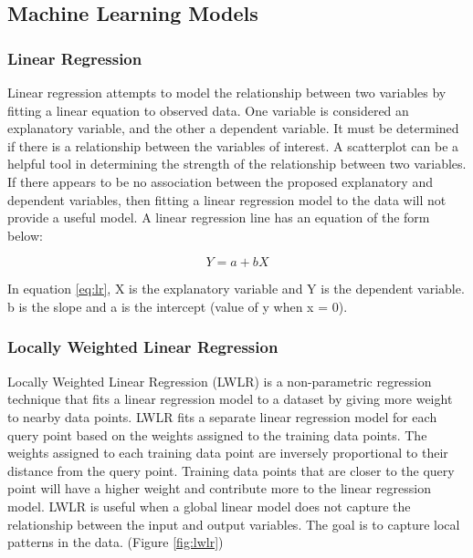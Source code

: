 \documentclass[conference]{IEEEtran}
\begin{document}
\subsection{Machine Learning Models} \label{sec:models}

\subsubsection{Linear Regression}
Linear regression attempts to model the relationship between two variables by fitting a linear equation to observed data.
One variable is considered an explanatory variable, and the other a dependent variable.
It must be determined if there is a relationship between the variables of interest.
A scatterplot can be a helpful tool in determining the strength of the relationship between two variables.
If there appears to be no association between the proposed explanatory and dependent variables, then fitting a linear regression model to the data will not provide a useful model.
A linear regression line has an equation of the form below:

\begin{equation} \label{eq:lr}
    Y = a + bX
\end{equation}

In equation \ref{eq:lr}, X is the explanatory variable and Y is the dependent variable.
b is the slope and a is the intercept (value of y when x = 0).

\subsubsection{Locally Weighted Linear Regression}
Locally Weighted Linear Regression (LWLR) is a non-parametric regression technique that fits a linear regression model to a dataset by giving more weight to nearby data points.
LWLR fits a separate linear regression model for each query point based on the weights assigned to the training data points.
The weights assigned to each training data point are inversely proportional to their distance from the query point.
Training data points that are closer to the query point will have a higher weight and contribute more to the linear regression model.
LWLR is useful when a global linear model does not capture the relationship between the input and output variables.
The goal is to capture local patterns in the data.
(Figure \ref{fig:lwlr})
\end{document}
